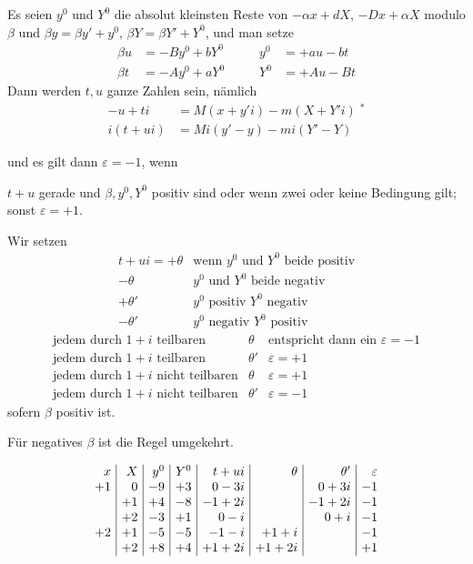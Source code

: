 Es seien $y^0$ und $Y^0$ die absolut kleinsten Reste von $-\alpha x+dX$, $-Dx+\alpha X$ modulo $\beta$ und $\beta y=\beta y'+y^0$, $\beta Y=\beta Y'+Y^0$, und man setze
\[
\begin{alignedat}{2}
\beta u&=-By^0+bY^0\qquad&y^0&=+au-bt\\
\beta t&=-Ay^0+aY^0&Y^0&=+Au-Bt
\end{alignedat}
\]
Dann werden $t,u$ ganze Zahlen sein, nämlich
\[
\begin{aligned}
-u+ti&=M(x+y'i)-m(X+Y'i)\;{}^*\\
i(t+ui)&=Mi(y'-y)-mi(Y'-Y)
\end{aligned}
\]

und es gilt dann $\varepsilon=-1$, wenn\par
\noindent $t+u$ gerade und $\beta,y^0,Y^0$ positiv sind oder wenn zwei oder keine Bedingung gilt; sonst $\varepsilon=+1$.\par
{}
Wir setzen
\[
\begin{array}{rl}
t+ui=+\theta&\text{wenn }y^0\text{ und }Y^0\text{ beide positiv}\\
-\theta&y^0\text{ und }Y^0\text{ beide negativ}\\
+\theta'&y^0\text{ positiv }Y^0\text{ negativ}\\
-\theta'&y^0\text{ negativ }Y^0\text{ positiv}
\end{array}
\]
\[
\begin{array}{llr}
\text{jedem durch }1+i\text{ teilbaren}&\theta&\text{entspricht dann ein }\varepsilon=-1\\
\text{jedem durch }1+i\text{ teilbaren}&\theta'&\varepsilon=+1\\
\text{jedem durch }1+i\text{ nicht teilbaren}&\theta&\varepsilon=+1\\
\text{jedem durch }1+i\text{ nicht teilbaren}&\theta'&\varepsilon=-1
\end{array}
\]
sofern $\beta$ positiv ist.\par
Für negatives $\beta$ ist die Regel umgekehrt.

\[
\setlength{\arraycolsep}{4pt}
\begin{array}{r|r|r|r|r|r|r|r}
x&X&y^0&Y^0&t+ui&\theta&\theta'&\varepsilon\\
+1&0&-9&+3&0-3i&&0+3i&-1\\
&+1&+4&-8&-1+2i&&-1+2i&-1\\
&+2&-3&+1&0-i&&0+i&-1\\
+2&+1&-5&-5&-1-i&+1+i&&-1\\
&+2&+8&+4&+1+2i&+1+2i&&+1
\end{array}
\]

